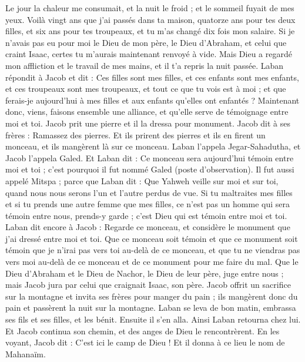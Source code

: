 \begin{multicols}{2}
Le jour la chaleur me consumait, et la nuit le froid ; et le sommeil fuyait de mes yeux.
Voilà vingt ans que j'ai passés dans ta maison, quatorze ans pour tes deux filles, et six ans pour tes troupeaux, et tu m'as changé dix fois mon salaire.
Si je n'avais pas eu pour moi le Dieu de mon père, le Dieu d'Abraham, et celui que craint Isaac, certes tu m'aurais maintenant renvoyé à vide. Mais Dieu a regardé mon affliction et le travail de mes mains, et il t'a repris la nuit passée.
Laban répondit à Jacob et dit : Ces filles sont mes filles, et ces enfants sont mes enfants, et ces troupeaux sont mes troupeaux, et tout ce que tu vois est à moi ; et que ferais-je aujourd'hui à mes filles et aux enfants qu'elles ont enfantés ?
Maintenant donc, viens, faisons ensemble une alliance, et qu'elle serve de témoignage entre moi et toi.
Jacob prit une pierre et il la dressa pour monument.
Jacob dit à ses frères : Ramassez des pierres. Et ils prirent des pierres et ils en firent un monceau, et ils mangèrent là sur ce monceau.
Laban l'appela Jegar-Sahadutha, et Jacob l'appela Galed.
Et Laban dit : Ce monceau sera aujourd'hui témoin entre moi et toi ; c'est pourquoi il fut nommé Galed (poste d'observation).
Il fut aussi appelé Mitspa ; parce que Laban dit : Que Yahweh veille sur moi et sur toi, quand nous nous serons l'un et l'autre perdus de vue.
Si tu maltraites mes filles et si tu prends une autre femme que mes filles, ce n'est pas un homme qui sera témoin entre nous, prends-y garde ; c'est Dieu qui est témoin entre moi et toi.
Laban dit encore à Jacob : Regarde ce monceau, et considère le monument que j'ai dressé entre moi et toi.
Que ce monceau soit témoin et que ce monument soit témoin que je n'irai pas vers toi au-delà de ce monceau, et que tu ne viendras pas vers moi au-delà de ce monceau et de ce monument pour me faire du mal.
Que le Dieu d'Abraham et le Dieu de Nachor, le Dieu de leur père, juge entre nous ; mais Jacob jura par celui que craignait Isaac, son père.
Jacob offrit un sacrifice sur la montagne et invita ses frères pour manger du pain ; ils mangèrent donc du pain et passèrent la nuit sur la montagne.
Laban se leva de bon matin, embrassa ses fils et ses filles, et les bénit. Ensuite il s'en alla. Ainsi Laban retourna chez lui.
\VerseOne{}Et Jacob continua son chemin, et des anges de Dieu le rencontrèrent.
En les voyant, Jacob dit : C'est ici le camp de Dieu ! Et il donna à ce lieu le nom de Mahanaïm.

\end{multicols}
